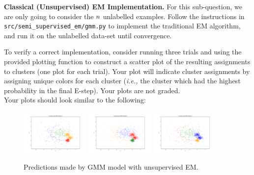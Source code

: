 \item {}
\textbf{Classical (Unsupervised) EM Implementation.}
For this sub-question, we are only going to consider the ${n}$ unlabelled examples. Follow the instructions in \texttt{src/semi\_supervised\_em/gmm.py} to implement the traditional EM algorithm, and run it on the unlabelled data-set until convergence.

To verify a correct implementation, consider running three trials and using the provided plotting function to construct a scatter plot of the resulting assignments to clusters (one plot for each trial). Your plot will indicate cluster assignments by assigning unique colors for each cluster (\emph{i.e.,} the cluster which had the highest probability in the final E-step).  Your plots are not graded.\\

Your plots should look similar to the following:

  \begin{figure}[H]
    \centering
    \includegraphics[width=0.3\textwidth]{02-semi_supervised_em/pred_0.pdf}
    \includegraphics[width=0.3\textwidth]{02-semi_supervised_em/pred_1.pdf}
    \includegraphics[width=0.3\textwidth]{02-semi_supervised_em/pred_2.pdf}
    \caption{Predictions made by GMM model with unsupervised EM.}
  \end{figure}
